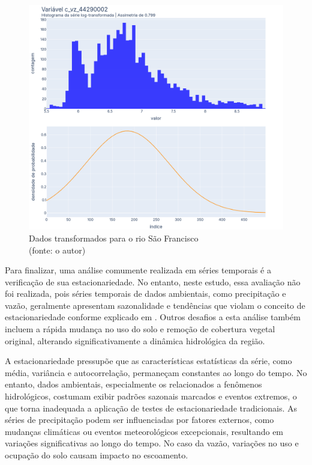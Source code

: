 \begin{figure}[!h]
	\centering
	\includegraphics[scale=0.8]{Figuras/rio_sao_francisco/rio_sao_francisco_depois_log.png}
	\caption{Dados transformados para o rio São Francisco\\(fonte: o autor)}
	\label{fig:rio_sao_francisco_depois_log}
\end{figure}
\clearpage

Para finalizar, uma análise comumente realizada em séries temporais é a verificação de sua estacionariedade. No entanto, neste estudo, essa avaliação não foi realizada, pois séries temporais de dados ambientais, como precipitação e vazão, geralmente apresentam sazonalidade e tendências que violam o conceito de estacionariedade conforme explicado em \citet{hyndman_fpp3_2024e}. Outros desafios a esta análise também incluem a rápida mudança no uso do solo e remoção de cobertura vegetal original, alterando significativamente a dinâmica hidrológica da região.\cite{rayyan-33388453}

A estacionariedade pressupõe que as características estatísticas da série, como média, variância e autocorrelação, permaneçam constantes ao longo do tempo. No entanto, dados ambientais, especialmente os relacionados a fenômenos hidrológicos, costumam exibir padrões sazonais marcados e eventos extremos, o que torna inadequada a aplicação de testes de estacionariedade tradicionais. As séries de precipitação podem ser influenciadas por fatores externos, como mudanças climáticas ou eventos meteorológicos excepcionais, resultando em variações significativas ao longo do tempo. No caso da vazão, variações no uso e ocupação do solo causam impacto no escoamento.


